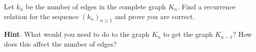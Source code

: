 \documentclass{book}
\begin{document}
\setcounter{cpjt}{135}
\addtocounter{cpjt}{-1}
\begin{activity}\label{activity-128}
\hypertarget{p-894}{}%
Let \(k_n\) be the number of edges in the complete graph \(K_n\).  Find a recurrence relation for the sequence \((k_n)_{n \ge 1}\) and prove you are correct.%
\par\smallskip%
\noindent\textbf{Hint}.\hypertarget{hint-93}{}\quad%
\hypertarget{p-895}{}%
What would you need to do to the graph \(K_n\) to get the graph \(K_{n-1}\)?  How does this affect the number of edges?%
\end{activity}

\clearpage
\end{document}
